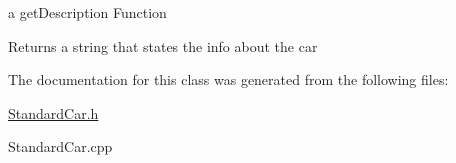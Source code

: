 a get\+Description Function \begin{DoxyReturn}{Returns}
a string that states the info about the car 
\end{DoxyReturn}


The documentation for this class was generated from the following files\+:\begin{DoxyCompactItemize}
\item 
\mbox{\hyperlink{_standard_car_8h}{Standard\+Car.\+h}}\item 
Standard\+Car.\+cpp\end{DoxyCompactItemize}
